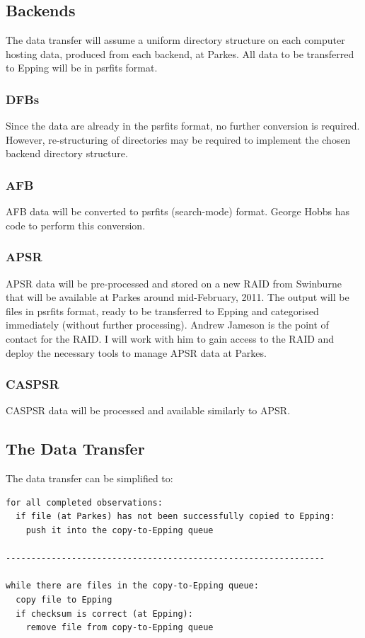 \documentclass{article}
\begin{document}
\subsection{Backends}
The data transfer will assume a uniform directory structure on each computer hosting data, produced from each backend, at Parkes. All data to be transferred to Epping will be in psrfits format.

\subsubsection{DFBs}
Since the data are already in the psrfits format, no further conversion is required. However, re-structuring of directories may be required to implement the chosen backend directory structure.

\subsubsection{AFB}
AFB data will be converted to psrfits (search-mode) format. George Hobbs has code to perform this conversion.

\subsubsection{APSR}
APSR data will be pre-processed and stored on a new RAID from Swinburne that will be available at Parkes around mid-February, 2011. The output will be files in psrfits format, ready to be transferred to Epping and categorised immediately (without further processing). Andrew Jameson is the point of contact for the RAID. I will work with him to gain access to the RAID and deploy the necessary tools to manage APSR data at Parkes.

\subsubsection{CASPSR}
CASPSR data will be processed and available similarly to APSR.

\subsection{The Data Transfer}
The data transfer can be simplified to:
\begin{verbatim}
for all completed observations: 
  if file (at Parkes) has not been successfully copied to Epping:
    push it into the copy-to-Epping queue

---------------------------------------------------------------

while there are files in the copy-to-Epping queue:
  copy file to Epping
  if checksum is correct (at Epping):
    remove file from copy-to-Epping queue
\end{verbatim}
\end{document}
